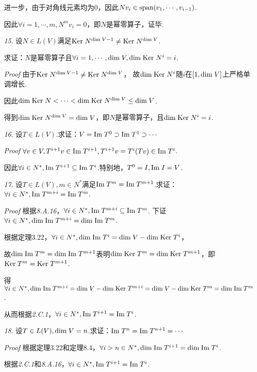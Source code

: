 进一步，由于对角线元素均为\(0\)，因此\(Nv_i \in \mathrm{span} (v_1,\cdots,v_{i-1})\).

因此\(\forall i=1,\cdots,m,N^m v_i=0\)，即\(N\)是幂零算子，证毕.

\hspace*{\fill}

\textit{15.}
设\(N \in L(V)\)满足\(\mathrm{Ker \;} N^{\mathrm{dim \;} V-1} \ne \mathrm{Ker \;} N^{\mathrm{dim \;} V}\).

求证：\(N\)是幂零算子且\(\forall i=1,\cdots,\mathrm{dim \;} V,\mathrm{dim \;} \mathrm{Ker \;} N^i=i\).

\textit{Proof}
由于\(\mathrm{Ker \;} N^{\mathrm{dim \;} V-1} \ne \mathrm{Ker \;} N^{\mathrm{dim \;} V}\)，
故\(\mathrm{dim \;} \mathrm{Ker \;} N^i\)随\(i\)在\([1,\mathrm{dim \;} V]\)上严格单调增长.

因此\(\mathrm{dim \;} \mathrm{Ker \;} N<\cdots<\mathrm{dim \;} \mathrm{Ker \;} N^{\mathrm{dim \;} V} \leq \mathrm{dim \;} V\).

得到\(\mathrm{dim \;} \mathrm{Ker \;} N^{\mathrm{dim \;} V}=\mathrm{dim \;} V\)，即\(N\)是幂零算子，且\(\mathrm{dim \;} \mathrm{Ker \;} N^i=i\).

\hspace*{\fill}

\textit{16.}
设\(T \in L(V)\).求证：\(V=\mathrm{Im \;} T^0 \supset \mathrm{Im \;} T^1 \supset \cdots\)

\textit{Proof}
\(\forall v \in V,T^{i+1}v \in \mathrm{Im \;} T^{i+1},T^{i+1}v=T^i(Tv) \in \mathrm{Im \;} T^i\).

因此\(\forall i \in N^*,\mathrm{Im \;} T^{i+1} \subseteq \mathrm{Im \;} T^i\).特别地，\(T^0=I,\mathrm{Im \;} I=V\).

\hspace*{\fill}

\textit{17.}
设\(T \in L(V),m \in N^*\)满足\(\mathrm{Im \;} T^m=\mathrm{Im \;} T^{m+1}\).求证：\(\forall i \in N^*,\mathrm{Im \;} T^{m+i}=\mathrm{Im \;} T^m\).

\textit{Proof}
根据\textit{8.A.16}，\(\forall i \in N^*,\mathrm{Im \;} T^{m+i} \subseteq \mathrm{Im \;} T^m\).
下证\(\forall i \in N^*,\mathrm{dim \;} \mathrm{Im \;} T^{m+i}=\mathrm{dim \;} \mathrm{Im \;} T^m\).

根据定理3.22，\(\forall i \in N^*,\mathrm{dim \;} \mathrm{Im \;} T^i=\mathrm{dim \;} V-\mathrm{dim \;} \mathrm{Ker \;} T^i\)，

故\(\mathrm{dim \;} \mathrm{Im \;} T^m=\mathrm{dim \;} \mathrm{Im \;} T^{m+1}\)表明\(\mathrm{dim \;} \mathrm{Ker \;} T^m=\mathrm{dim \;} \mathrm{Ker \;} T^{m+1}\)，即\(\mathrm{Ker \;} T^m =\mathrm{Ker \;} T^{m+1}\).

得\(\forall i \in N^*,\mathrm{dim \;} \mathrm{Im \;} T^{m+i}=\mathrm{dim \;} V-\mathrm{dim \;} \mathrm{Ker \;} T^{m+i}=\mathrm{dim \;} V-\mathrm{dim \;} \mathrm{Ker \;} T^m=\mathrm{dim \;} \mathrm{Im \;} T^m\).

从而根据\textit{2.C.1}，\(\forall i \in N^*,\mathrm{Im \;} T^{i+1}=\mathrm{Im \;} T^i\).

\hspace*{\fill}

\textit{18.}
设\(T \in L(V),\mathrm{dim \;} V=n\).求证：\(\mathrm{Im \;} T^n=\mathrm{Im \;} T^{n+1}=\cdots\)

\textit{Proof}
根据定理3.22和定理8.4，\(\forall i>n \in N^*,\mathrm{dim \;} \mathrm{Im \;} T^{i+1}=\mathrm{dim \;} \mathrm{Im \;} T^i\).

根据\textit{2.C.1}和\textit{8.A.16}，\(\forall i \in N^*,\mathrm{Im \;} T^{i+1}=\mathrm{Im \;} T^i\).

